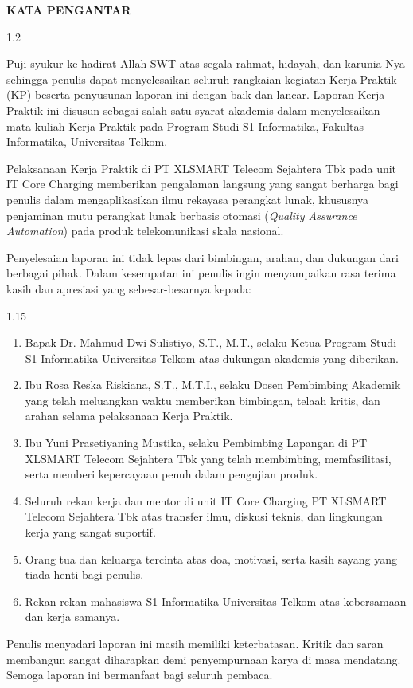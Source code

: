 \documentclass[12pt,a4paper]{article}
\begin{document}
\clearpage
\begin{center}
    {\bfseries\large KATA PENGANTAR\par}
\end{center}
\vspace{0.2cm}
\begin{spacing}{1.2}

Puji syukur ke hadirat Allah SWT atas segala rahmat, hidayah, dan karunia-Nya sehingga penulis dapat menyelesaikan seluruh rangkaian kegiatan Kerja Praktik (KP) beserta penyusunan laporan ini dengan baik dan lancar. Laporan Kerja Praktik ini disusun sebagai salah satu syarat akademis dalam menyelesaikan mata kuliah Kerja Praktik pada Program Studi S1 Informatika, Fakultas Informatika, Universitas Telkom.

Pelaksanaan Kerja Praktik di PT XLSMART Telecom Sejahtera Tbk pada unit IT Core Charging memberikan pengalaman langsung yang sangat berharga bagi penulis dalam mengaplikasikan ilmu rekayasa perangkat lunak, khususnya penjaminan mutu perangkat lunak berbasis otomasi (\textit{Quality Assurance Automation}) pada produk telekomunikasi skala nasional.

Penyelesaian laporan ini tidak lepas dari bimbingan, arahan, dan dukungan dari berbagai pihak. Dalam kesempatan ini penulis ingin menyampaikan rasa terima kasih dan apresiasi yang sebesar-besarnya kepada:
\begin{spacing}{1.15}
\begin{enumerate}[label=\arabic*.,leftmargin=1.5em,itemsep=1pt,topsep=1pt,parsep=0pt]
    \item Bapak Dr. Mahmud Dwi Sulistiyo, S.T., M.T., selaku Ketua Program Studi S1 Informatika Universitas Telkom atas dukungan akademis yang diberikan.
    \item Ibu Rosa Reska Riskiana, S.T., M.T.I., selaku Dosen Pembimbing Akademik yang telah meluangkan waktu memberikan bimbingan, telaah kritis, dan arahan selama pelaksanaan Kerja Praktik.
    \item Ibu Yuni Prasetiyaning Mustika, selaku Pembimbing Lapangan di PT XLSMART Telecom Sejahtera Tbk yang telah membimbing, memfasilitasi, serta memberi kepercayaan penuh dalam pengujian produk.
    \item Seluruh rekan kerja dan mentor di unit IT Core Charging PT XLSMART Telecom Sejahtera Tbk atas transfer ilmu, diskusi teknis, dan lingkungan kerja yang sangat suportif.
    \item Orang tua dan keluarga tercinta atas doa, motivasi, serta kasih sayang yang tiada henti bagi penulis.
    \item Rekan-rekan mahasiswa S1 Informatika Universitas Telkom atas kebersamaan dan kerja samanya.
\end{enumerate}
\end{spacing}
Penulis menyadari laporan ini masih memiliki keterbatasan. Kritik dan saran membangun sangat diharapkan demi penyempurnaan karya di masa mendatang. Semoga laporan ini bermanfaat bagi seluruh pembaca.


\end{spacing}
\end{document}
